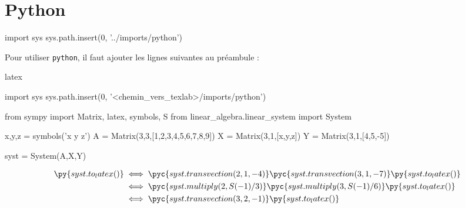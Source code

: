 
\section{Python}

    \begin{pycode}
import sys
sys.path.insert(0, '../imports/python')
    \end{pycode}

    Pour utiliser \verb|python|, il faut ajouter les lignes suivantes au préambule :

    \begin{code}{latex}
        
        \begin{pycode}
            import sys
            sys.path.insert(0, '<chemin_vers_texlab>/imports/python')
        \end{pycode}
    \end{code}

    \begin{latexcode}
\begin{pycode}
from sympy import Matrix, latex, symbols, S
from linear_algebra.linear_system import System

x,y,z = symbols('x y z')
A = Matrix(3,3,[1,2,3,4,5,6,7,8,9])
X = Matrix(3,1,[x,y,z])
Y = Matrix(3,1,[4,5,-5])

syst = System(A,X,Y)
\end{pycode}
        \begin{align*}
            \py{syst.to_latex()} & \iff \pyc{syst.transvection(2,1,-4)}
                \pyc{syst.transvection(3,1,-7)}
                \py{syst.to_latex()} \\
                                 & \iff \pyc{syst.multiply(2, S(-1)/3)}
                \pyc{syst.multiply(3,S(-1)/6)}
                \py{syst.to_latex()} \\
                                 & \iff \pyc{syst.transvection(3,2,-1)}
                \py{syst.to_latex()}
        \end{align*}
    \end{latexcode}
